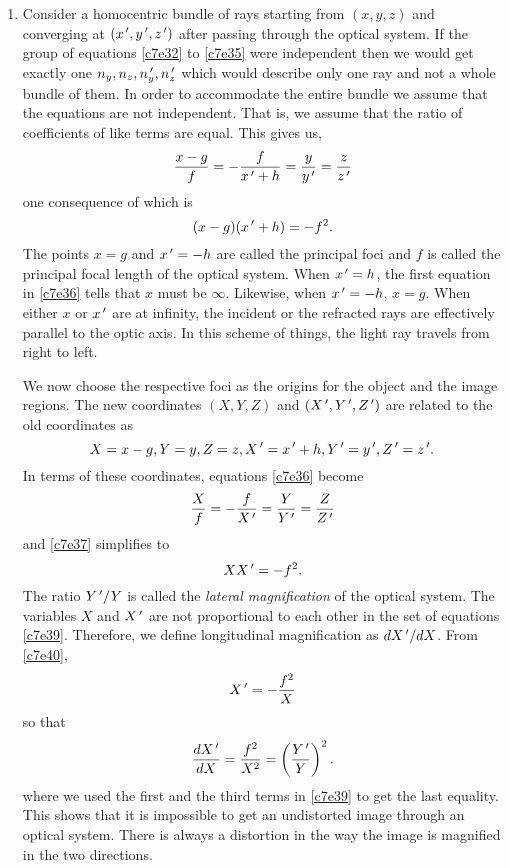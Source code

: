 \begin{enumerate}
\item Consider a homocentric bundle of rays starting from $(x, y, z)$ and
converging at $(x^{\,\prime}, y^{\,\prime}, z^{\,\prime})$ after passing through the optical system.
If the group of equations \eqref{c7e32} to \eqref{c7e35} were independent then
we would get exactly one $n_y, n_z, n_y^{\,\prime}, n_z^{\,\prime}$ which would describe only
one ray and not a whole bundle of them. In order to accommodate the entire
bundle we assume that the equations are not independent. That is, we assume that
the ratio of coefficients of like terms are equal. This gives us,
\begin{equation}\label{c7e36}
\frac{x - g}{f} = -\frac{f}{x^{\,\prime} + h} = \frac{y}{y^{\,\prime}} = \frac{z}{z^{\,\prime}}
\end{equation}
one consequence of which is
\begin{equation}\label{c7e37}
(x - g)(x^{\,\prime} + h) = -f^2.
\end{equation}
The points $x = g$ and $x^{\,\prime} = -h$ are called the principal foci and $f$ is 
called the principal focal length of the optical system. When $x^{\,\prime} = h$, the 
first equation in \eqref{c7e36} tells that $x$ must be $\infty$. Likewise, when 
$x^{\,\prime} = -h$, $x = g$. When either $x$ or $x^{\,\prime}$ are at infinity, the incident 
or the refracted rays are effectively parallel to the optic axis. In this 
scheme of things, the light ray travels from right to left.

We now choose the respective foci as the origins for the object and the image 
regions. The new coordinates $(X, Y, Z)$ and $(X^{\,\prime}, Y^{\,\prime}, Z^{\,\prime})$ are related
to the old coordinates as
\begin{equation}\label{c7e38}
X = x - g, Y = y, Z = z, X^{\,\prime} = x^{\,\prime} + h, Y^{\,\prime} = y^{\,\prime}, Z^{\,\prime} = z^{\,\prime}.
\end{equation}
In terms of these coordinates, equations \eqref{c7e36} become
\begin{equation}\label{c7e39}
\frac{X}{f} = -\frac{f}{X^{\,\prime}} = \frac{Y}{Y^{\,\prime}} = \frac{Z}{Z^{\,\prime}}
\end{equation}
and \eqref{c7e37} simplifies to
\begin{equation}\label{c7e40}
XX^{\,\prime} = -f^2.
\end{equation}
The ratio $Y^{\,\prime}/Y$ is called the \emph{lateral magnification} of the optical
system. The variables $X$ and $X^{\,\prime}$ are not proportional to each other in
the set of equations \eqref{c7e39}. Therefore, we define longitudinal 
magnification as $dX^{\,\prime}/dX$. From \eqref{c7e40},
\[
X^{\,\prime} = -\frac{f^2}{X}
\]
so that
\begin{equation}\label{c7e41}
\frac{d{X^{\,\prime}}}{d{X}} = \frac{f^2}{X^2} = \left(\frac{Y^{\,\prime}}{Y}\right)^2.
\end{equation}
where we used the first and the third terms in \eqref{c7e39} to get the last
equality. This shows that it is impossible to get an undistorted image through
an optical system. There is always a distortion in the way the image is 
magnified in the two directions.


\end{enumerate}
